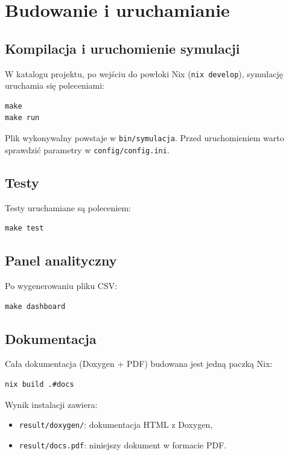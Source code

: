 \documentclass[12pt,a4paper]{article}
\begin{document}
\section{Budowanie i uruchamianie}

\subsection{Kompilacja i uruchomienie symulacji}

W katalogu projektu, po wejściu do powłoki Nix (\texttt{nix develop}), symulację
uruchamia się poleceniami:

\begin{lstlisting}
make
make run
\end{lstlisting}

Plik wykonywalny powstaje w \texttt{bin/symulacja}. Przed uruchomieniem warto
sprawdzić parametry w \texttt{config/config.ini}.

\subsection{Testy}

Testy uruchamiane są poleceniem:

\begin{lstlisting}
make test
\end{lstlisting}

\subsection{Panel analityczny}

Po wygenerowaniu pliku CSV:

\begin{lstlisting}
make dashboard
\end{lstlisting}

\subsection{Dokumentacja}

Cała dokumentacja (Doxygen + PDF) budowana jest jedną paczką Nix:

\begin{lstlisting}
nix build .#docs
\end{lstlisting}

Wynik instalacji zawiera:
\begin{itemize}[noitemsep]
	\item \texttt{result/doxygen/}: dokumentacja HTML z Doxygen,
	\item \texttt{result/docs.pdf}: niniejszy dokument w formacie PDF.
\end{itemize}
\end{document}
